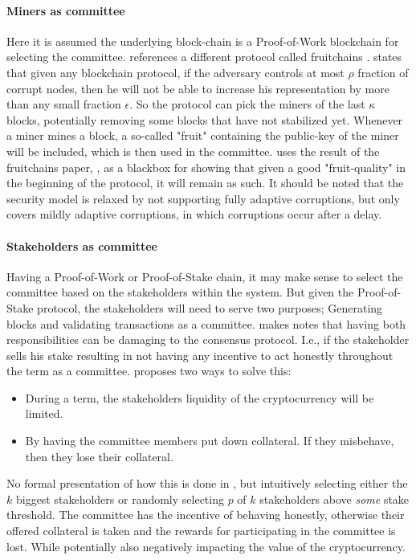 \paragraph{Miners as committee} Here it is assumed the underlying block-chain is a Proof-of-Work blockchain for selecting the committee. \cite{thunderella} references a different protocol called fruitchains \cite{fruitchains}. \cite{fruitchains} states that given any blockchain protocol, if the adversary controls at most $\rho$ fraction of corrupt nodes, then he will not be able to increase his representation by more than any small fraction $\epsilon$. So the protocol can pick the miners of the last $\kappa$ blocks, potentially removing some blocks that have not stabilized yet. Whenever a miner mines a block, a so-called "fruit" containing the public-key of the miner will be included, which is then used in the committee. \cite{thunderella} uses the result of the fruitchains paper, \cite{fruitchains}, as a blackbox for showing that given a good "fruit-quality" in the beginning of the protocol, it will remain as such. It should be noted that the security model is relaxed by not supporting fully adaptive corruptions, but only covers mildly adaptive corruptions, in which corruptions occur after a delay.

\paragraph{Stakeholders as committee} Having a Proof-of-Work or Proof-of-Stake chain, it may make sense to select the committee based on the stakeholders within the system. But given the Proof-of-Stake protocol, the stakeholders will need to serve two purposes; Generating blocks and validating transactions as a committee. \cite{thunderella} makes notes that having both responsibilities can be damaging to the consensus protocol. I.e., if the stakeholder sells his stake resulting in not having any incentive to act honestly throughout the term as a committee. \cite{thunderella} proposes two ways to solve this:
\begin{itemize}
    \item During a term, the stakeholders liquidity of the cryptocurrency will be limited.
    \item By having the committee members put down collateral. If they misbehave, then they lose their collateral.
\end{itemize}

No formal presentation of how this is done in \cite{thunderella}, but intuitively selecting either the $k$ biggest stakeholders or randomly selecting $p$ of $k$ stakeholders above \emph{some} stake threshold. The committee has the incentive of behaving honestly, otherwise their offered collateral is taken and the rewards for participating in the committee is lost. While potentially also negatively impacting the value of the cryptocurrency.


